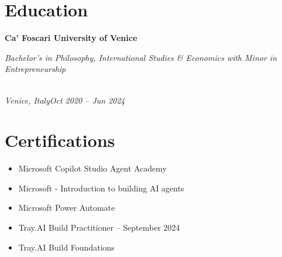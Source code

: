 \documentclass[a4paper,10pt]{article}
\newcommand{\role}[4]{\vspace{3pt}\noindent\hspace{0.6em}\parbox[t]{0.38\textwidth}{\raggedright\textbf{#1}}\hfill\parbox[t]{0.58\textwidth}{\raggedleft\textit{#2}}\\{\textit{#3}\hfill\textit{#4}}\vspace{1pt}}
\begin{document}
\section{Education}
\role{Ca' Foscari University of Venice}{Bachelor's in Philosophy, International Studies \& Economics with Minor in Entrepreneurship}{Venice, Italy}{Oct 2020 -- Jun 2024}

\section{Certifications}
\begin{itemize}
\item Microsoft Copilot Studio Agent Academy
\item Microsoft - Introduction to building AI agents
\item Microsoft Power Automate
\item Tray.AI Build Practitioner -- September 2024
\item Tray.AI Build Foundations
\end{itemize}
\end{document}

